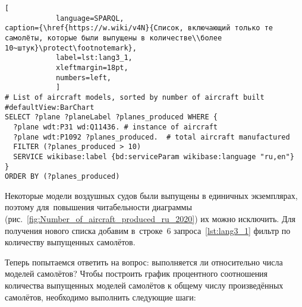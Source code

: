 \begin{lstlisting}[ 
            language=SPARQL, 
caption={\href{https://w.wiki/v4N}{Список, включающий только те самолёты, которые были выпущены в количестве\\более 10~штук}\protect\footnotemark}, 
            label=lst:lang3_1, 
            xleftmargin=18pt, 
            numbers=left,
            ]
# List of aircraft models, sorted by number of aircraft built
#defaultView:BarChart
SELECT ?plane ?planeLabel ?planes_produced WHERE {
  ?plane wdt:P31 wd:Q11436. # instance of aircraft
  ?plane wdt:P1092 ?planes_produced.  # total aircraft manufactured
  FILTER (?planes_produced > 10)
  SERVICE wikibase:label {bd:serviceParam wikibase:language "ru,en"}
}
ORDER BY (?planes_produced)
\end{lstlisting}


\newpage
Некоторые модели воздушных судов были выпущены в единичных экземплярах, 
поэтому для~повышения читабельности диаграммы 
(рис.~\ref{fig:Number_of_aircraft_produced_ru_2020}) их можно исключить. 
Для получения нового списка добавим в~строке~6 запроса~\ref{lst:lang3_1} 
фильтр по количеству выпущенных самолётов.



Теперь 
 попытаемся ответить на вопрос: выполняется ли  относительно числа моделей самолётов?
Чтобы построить график процентного соотношения количества выпущенных моделей самолётов 
к общему числу произведённых самолётов, необходимо выполнить следующие шаги:

